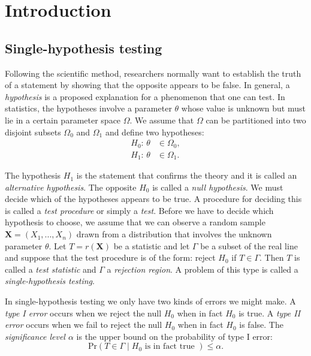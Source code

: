 \documentclass[10pt]{article}
\begin{document}
\section{Introduction} \label{sec: intro}

\subsection{Single-hypothesis testing}
Following the scientific method, researchers normally want to establish the truth of a statement by showing that the opposite appears to be false. In general, a {\it hypothesis} is a proposed explanation for a phenomenon that one can test. In statistics, the hypotheses involve a parameter $\theta$ whose value is unknown but must lie in a certain parameter space $\Omega$. We assume that $\Omega$ can be partitioned into two disjoint subsets $\Omega_0$ and $\Omega_1$ and define two hypotheses:
\begin{align*}
H_{0}\text{: } \theta &\in \Omega_0, \\
H_{1}\text{: } \theta &\in \Omega_1.
\end{align*}

The hypothesis $H_{1}$ is the statement that confirms the theory and it is called an {\it alternative hypothesis}. The opposite $H_{0}$ is called a {\it null hypothesis}. We must decide which of the hypotheses appears to be true. A procedure for deciding this is called a {\it test procedure} or simply a {\it test}. Before we have to decide which hypothesis to choose, we assume that we can observe a random sample $\mathbf{X} = (X_{1}, ..., X_{n})$ drawn from a distribution that involves the unknown parameter $\theta$. Let $T = r(\mathbf{X})$ be a statistic and let $\Gamma$ be a subset of the real line and suppose that the test procedure is of the form: reject $H_{0}$ if $T \in \Gamma$. Then $T$ is called a {\it test statistic} and $\Gamma$ a {\it rejection region}. A problem of this type is called a {\it single-hypothesis testing}.

In single-hypothesis testing we only have two kinds of errors we might make. A {\it type I error} occurs when we reject the null $H_{0}$ when in fact $H_{0}$ is true. A {\it type II error} occurs when we fail to reject the null $H_{0}$ when in fact $H_{0}$ is false. The {\it significance level $\alpha$} is the upper bound on the probability of type I error:
\begin{equation} \label{eq: condition1}
	\text{Pr}(T \in \Gamma \mid H_{0} \text{ is in fact true }) \leq \alpha.
\end{equation}
\end{document}
